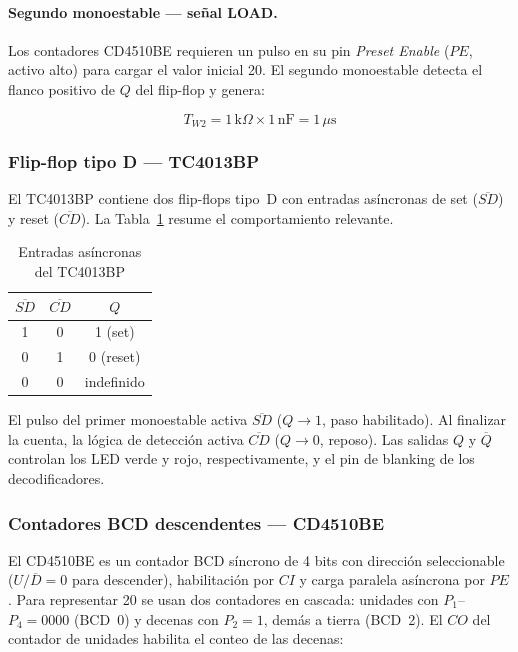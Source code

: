 \documentclass[journal]{IEEEtran}
\begin{document}
\paragraph{Segundo monoestable — señal LOAD.}
Los contadores CD4510BE requieren un pulso en su pin \textit{Preset Enable} ($PE$,
activo alto) para cargar el valor inicial 20. El segundo monoestable detecta el flanco
positivo de $Q$ del flip-flop y genera:

\begin{equation}
    T_{W2} = 1\,\text{k}\Omega \times 1\,\text{nF} = 1\,\mu\text{s}
    \label{eq:tw2}
\end{equation}

\subsubsection{Flip-flop tipo D — TC4013BP}

El TC4013BP contiene dos flip-flops tipo~D con entradas asíncronas de set
($\overline{SD}$) y reset ($\overline{CD}$). La Tabla~\ref{tab:verdad_4013} resume
el comportamiento relevante.

\begin{table}[htbp]
    \centering
    \caption{Entradas asíncronas del TC4013BP}
    \label{tab:verdad_4013}
    \begin{tabular}{ccc}
        \toprule
        $\overline{SD}$ & $\overline{CD}$ & $Q$ \\
        \midrule
        1 & 0 & 1 (set) \\
        0 & 1 & 0 (reset) \\
        0 & 0 & indefinido \\
        \bottomrule
    \end{tabular}
\end{table}

El pulso del primer monoestable activa $\overline{SD}$ ($Q \to 1$, paso habilitado).
Al finalizar la cuenta, la lógica de detección activa $\overline{CD}$ ($Q \to 0$,
reposo). Las salidas $Q$ y $\overline{Q}$ controlan los LED verde y rojo,
respectivamente, y el pin de blanking de los decodificadores.

\subsubsection{Contadores BCD descendentes — CD4510BE}

El CD4510BE es un contador BCD síncrono de 4 bits con dirección seleccionable
($U/\overline{D} = 0$ para descender), habilitación por $CI$ y carga paralela asíncrona
por $PE$. Para representar 20 se usan dos contadores en cascada: unidades con
$P_1$--$P_4 = 0000$ (BCD~0) y decenas con $P_2 = 1$, demás a tierra (BCD~2). El $CO$
del contador de unidades habilita el conteo de las decenas:
\end{document}
